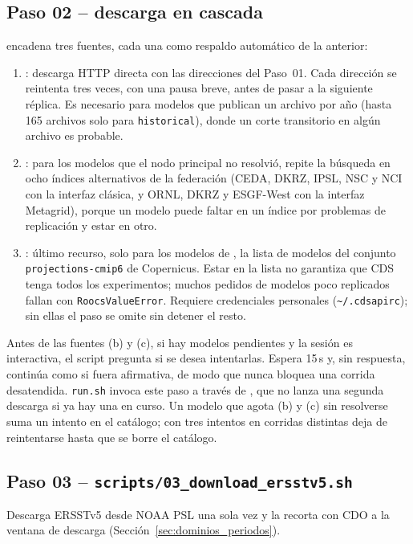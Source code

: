 \subsection{Paso 02 -- descarga en cascada}
\label{sec:paso02}
 encadena tres fuentes, cada una como respaldo automático de la anterior:
\begin{enumerate}[label=(\alph*)]
\item {}: descarga HTTP directa con las direcciones del Paso~01. Cada dirección se reintenta tres veces, con una pausa breve, antes de pasar a la siguiente réplica. Es necesario para modelos que publican un archivo por año (hasta 165 archivos solo para \texttt{historical}), donde un corte transitorio en algún archivo es probable.
\item {}: para los modelos que el nodo principal no resolvió, repite la búsqueda en ocho índices alternativos de la federación (CEDA, DKRZ, IPSL, NSC y NCI con la interfaz clásica, y ORNL, DKRZ y ESGF-West con la interfaz Metagrid), porque un modelo puede faltar en un índice por problemas de replicación y estar en otro.
\item {}: último recurso, solo para los modelos de , la lista de modelos del conjunto \texttt{projections-cmip6} de Copernicus. Estar en la lista no garantiza que CDS tenga todos los experimentos; muchos pedidos de modelos poco replicados fallan con \texttt{RoocsValueError}. Requiere credenciales personales (\texttt{\textasciitilde/.cdsapirc}); sin ellas el paso se omite sin detener el resto.
\end{enumerate}
Antes de las fuentes (b) y (c), si hay modelos pendientes y la sesión es interactiva, el script pregunta si se desea intentarlas. Espera 15\,s y, sin respuesta, continúa como si fuera afirmativa, de modo que nunca bloquea una corrida desatendida. \texttt{run.sh} invoca este paso a través de , que no lanza una segunda descarga si ya hay una en curso. Un modelo que agota (b) y (c) sin resolverse suma un intento en el catálogo; con tres intentos en corridas distintas deja de reintentarse hasta que se borre el catálogo.

\subsection{Paso 03 -- \texttt{scripts/03\_download\_ersstv5.sh}}
Descarga ERSSTv5 desde NOAA PSL una sola vez y la recorta con CDO a la ventana de descarga (Sección~\ref{sec:dominios_periodos}).

